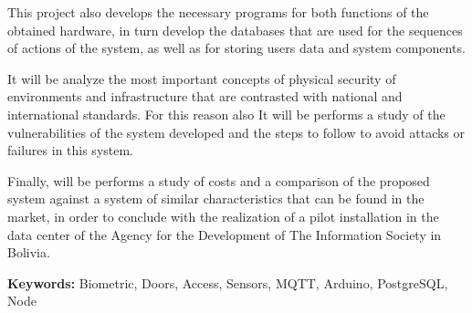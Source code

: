 \documentclass[../principal.tex]{subfiles}
\begin{document}
    This project also develops the necessary programs for both functions of the obtained hardware, in turn develop the databases that are used for the sequences of actions of the system, as well as for storing users data and system components.

    It will be analyze the most important concepts of physical security of environments and infrastructure that are contrasted with national and international standards. For this reason also It will be performs a study of the vulnerabilities of the system developed and the steps to follow to avoid attacks or failures in this system.

    Finally, will be performs a study of costs and a comparison of the proposed system against a system of similar characteristics that can be found in the market, in order to conclude with the realization of a pilot installation in the data center of the Agency for the Development of The Information Society in Bolivia.

  \textbf{Keywords: } Biometric, Doors, Access, Sensors, MQTT, Arduino, PostgreSQL, Node
\end{document}
